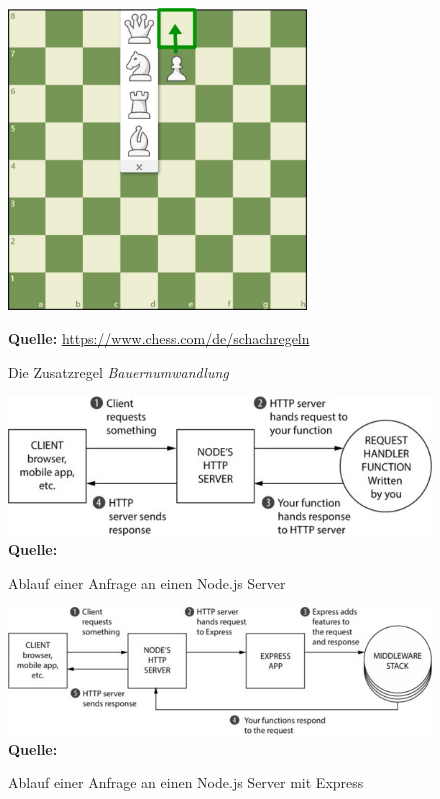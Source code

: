 \documentclass[a4paper,12pt]{report}
\begin{document}
  \begin{figure}[ht]
\centering
  \includegraphics[height=80mm]{promotion.jpeg}
   
   
\raggedleft
    \footnotesize\sffamily\textbf{Quelle:} \url{https://www.chess.com/de/schachregeln}
  \caption{Die Zusatzregel \textit{Bauernumwandlung}}
  \label{fig:promotion}
\end{figure}

  \begin{figure}[ht]
\raggedleft
  \includegraphics[width=160mm]{node-request.jpg}
    \footnotesize\sffamily\textbf{Quelle:} \cite{expressbook}
  \caption{Ablauf einer Anfrage an einen Node.js Server}
  \label{fig:node-request}
\end{figure}


  \begin{figure}[ht]
\raggedleft
  \includegraphics[width=160mm]{express-request.jpg}
    \footnotesize\sffamily\textbf{Quelle:} \cite{expressbook}
  \caption{Ablauf einer Anfrage an einen Node.js Server mit Express}
  \label{fig:express-request}
\end{figure}
\end{document}
